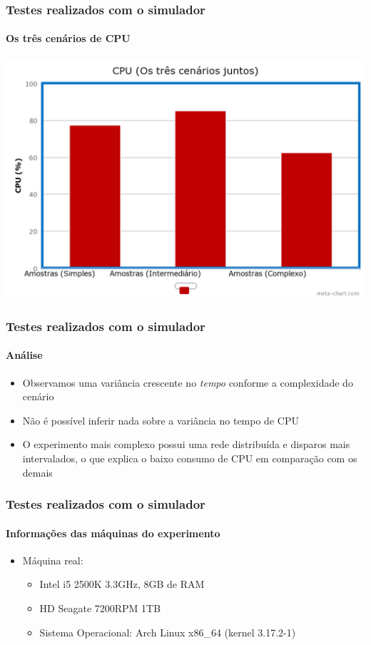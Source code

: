 \documentclass{beamer}
\begin{document}
\begin{frame}
	\frametitle{Testes realizados com o simulador}
	\framesubtitle{Os três cenários de CPU}
	\begin{center}
	\includegraphics[scale=0.18]{chart(7).png}
	\end{center}
\end{frame}

\begin{frame}
	\frametitle{Testes realizados com o simulador}
	\framesubtitle{Análise}
	\begin{itemize}
		\item Observamos uma variância crescente no \textit{tempo} conforme a complexidade do cenário
		\item Não é possível inferir nada sobre a variância no tempo de CPU
		\item O experimento mais complexo possui uma rede distribuída e disparos mais intervalados, o que explica o baixo consumo de CPU em comparação com os demais
	\end{itemize}
\end{frame}

\begin{frame}
	\frametitle{Testes realizados com o simulador}
	\framesubtitle{Informações das máquinas do experimento}
	\begin{itemize}
		\item Máquina real:
			\begin{itemize}
				\item Intel i5 2500K 3.3GHz, 8GB de RAM
				\item HD Seagate 7200RPM 1TB
				\item Sistema Operacional: Arch Linux x86\_64 (kernel 3.17.2-1)
			\end{itemize}
	\end{itemize}
\end{frame}
\end{document}
